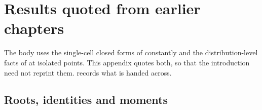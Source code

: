 \renewcommand{\thesection}{\thechapter.\Alph{section}}
\setcounter{section}{0}


\section{Results quoted from earlier chapters}
\label{p:app:quoted}

The body uses the single-cell closed forms of \ChCore{} constantly and the
distribution-level facts of \ChDist{} at isolated points. This appendix
quotes both, so that the introduction need not reprint them.
 records what is handed across.

\subsection{Roots, identities and moments}

